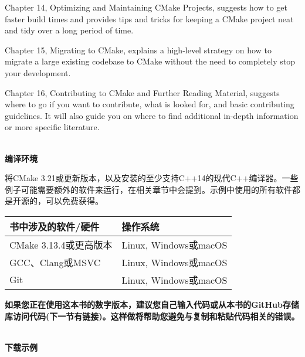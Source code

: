 Chapter 14, Optimizing and Maintaining CMake Projects, suggests how to get faster build times and provides tips and tricks for keeping a CMake project neat and tidy over a long period of time. 

Chapter 15, Migrating to CMake, explains a high-level strategy on how to migrate a large existing codebase to CMake without the need to completely stop your development.

Chapter 16, Contributing to CMake and Further Reading Material, suggests where to go if you want to contribute, what is looked for, and basic contributing guidelines. It will also guide you on where to find additional in-depth information or more specific literature.

\hspace*{\fill} \\ %
\textbf{编译环境}

将CMake 3.21或更新版本，以及安装的至少支持C++14的现代C++编译器。一些例子可能需要额外的软件来运行，在相关章节中会提到。示例中使用的所有软件都是开源的，可以免费获得。

\begin{table}[H]
	\centering
	\begin{tabular}{|l|l|}
		\hline
		书中涉及的软件/硬件                                                                                                                  & 操作系统                                                             \\ \hline
		CMake 3.13.4或更高版本                                                                                                                                  &                                                                           Linux, Windows或macOS       \\  \hline
		GCC、Clang或MSVC              &                                                                                  Linux, Windows或macOS\\  \hline
		Git  &  Linux, Windows或macOS                                                                                \\ \hline
	\end{tabular}
\end{table}

\textbf{如果您正在使用这本书的数字版本，建议您自己输入代码或从本书的GitHub存储库访问代码(下一节有链接)。这样做将帮助您避免与复制和粘贴代码相关的错误。}

\hspace*{\fill} \\ %
\textbf{下载示例}

